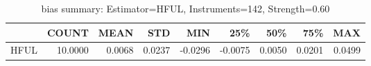 \begin{table}[ht]
\centering
\caption{bias summary: Estimator=HFUL, Instruments=142, Strength=0.60}
\begin{tabular}{lrrrrrrrr}
\toprule
 & COUNT & MEAN & STD & MIN & 25\% & 50\% & 75\% & MAX \\
\midrule
HFUL & 10.0000 & 0.0068 & 0.0237 & -0.0296 & -0.0075 & 0.0050 & 0.0201 & 0.0499 \\
\bottomrule
\end{tabular}
\end{table}
